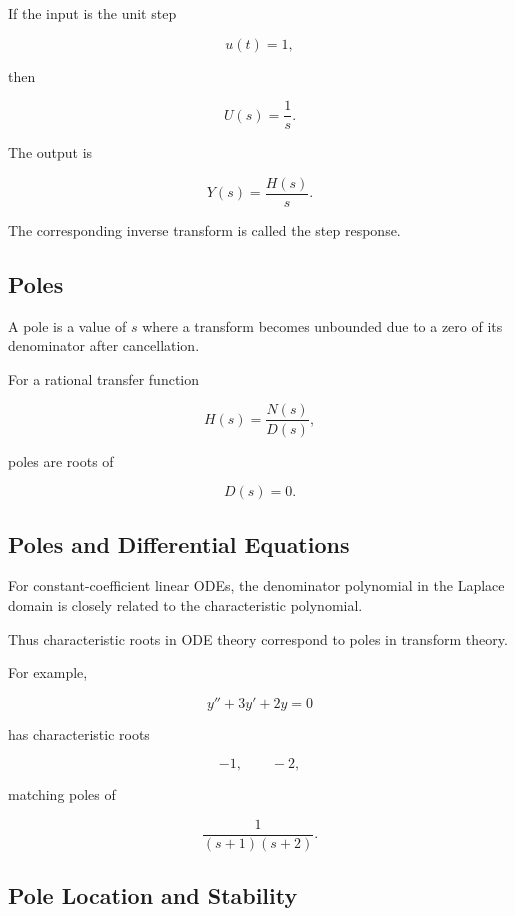 If the input is the unit step

\[
u(t)=1,
\]

then

\[
U(s)
=
\frac1s.
\]

The output is

\[
\boxed{
Y(s)
=
\frac{
H(s)
}{
s
}.
}
\]

The corresponding inverse transform is called the step response.

\subsection{Poles}
\label{subsec:transform-poles}

A pole is a value of \(s\) where a transform becomes unbounded due to a
zero of its denominator after cancellation.

For a rational transfer function

\[
\boxed{
H(s)
=
\frac{
N(s)
}{
D(s)
},
}
\]

poles are roots of

\[
\boxed{
D(s)=0.
}
\]

\subsection{Poles and Differential Equations}
\label{subsec:poles-differential-equations}

For constant-coefficient linear ODEs, the denominator polynomial in the
Laplace domain is closely related to the characteristic polynomial.

Thus characteristic roots in ODE theory correspond to poles in transform
theory.

For example,

\[
y''+3y'+2y=0
\]

has characteristic roots

\[
-1,
\qquad
-2,
\]

matching poles of

\[
\frac1{(s+1)(s+2)}.
\]

\subsection{Pole Location and Stability}
\label{subsec:pole-location-stability}

